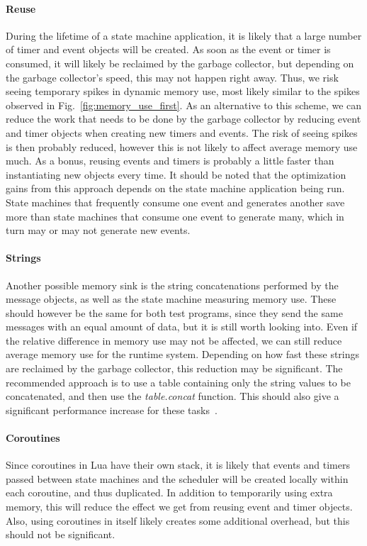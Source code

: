 \paragraph{Reuse} During the lifetime of a state machine application, it is likely that a large number of timer and event objects will be created. As soon as the event or timer is consumed, it will likely be reclaimed by the garbage collector, but depending on the garbage collector's speed, this may not happen right away. Thus, we risk seeing temporary spikes in dynamic memory use, most likely similar to the spikes observed in Fig.~\ref{fig:memory_use_first}. As an alternative to this scheme, we can reduce the work that needs to be done by the garbage collector by reducing event and timer objects when creating new timers and events. The risk of seeing spikes is then probably reduced, however this is not likely to affect average memory use much. As a bonus, reusing events and timers is probably a little faster than instantiating new objects every time. It should be noted that the optimization gains from this approach depends on the state machine application being run. State machines that frequently consume one event and generates another save more than state machines that consume one event to generate many, which in turn may or may not generate new events.

\paragraph{Strings} Another possible memory sink is the string concatenations performed by the message objects, as well as the state machine measuring memory use. These should however be the same for both test programs, since they send the same messages with an equal amount of data, but it is still worth looking into. Even if the relative difference in memory use may not be affected, we can still reduce average memory use for the runtime system. Depending on how fast these strings are reclaimed by the garbage collector, this reduction may be significant. The recommended approach is to use a table containing only the string values to be concatenated, and then use the \emph{table.concat} function. This should also give a significant performance increase for these tasks~\cite{chapter:lua_performance_tips}.

\paragraph{Coroutines} Since coroutines in Lua have their own stack, it is likely that events and timers passed between state machines and the scheduler will be created locally within each coroutine, and thus duplicated. In addition to temporarily using extra memory, this will reduce the effect we get from reusing event and timer objects. Also, using coroutines in itself likely creates some additional overhead, but this should not be significant.

